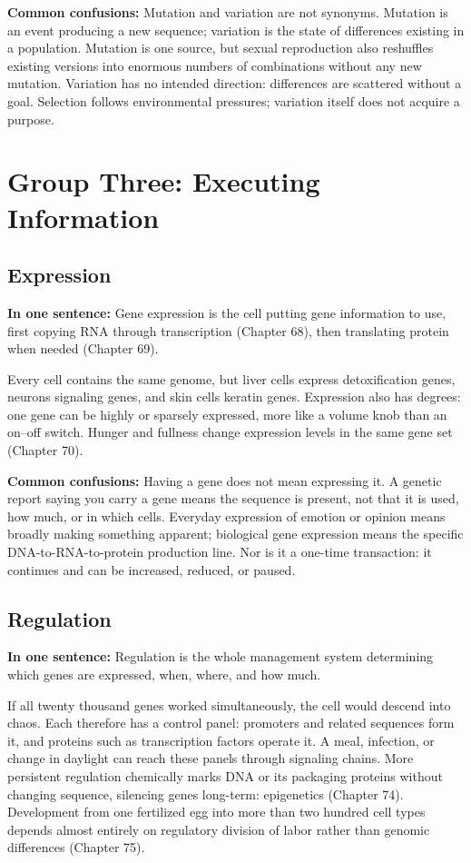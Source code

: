 \textbf{Common confusions:} Mutation and variation are not synonyms. Mutation is an event producing a new sequence; variation is the state of differences existing in a population. Mutation is one source, but sexual reproduction also reshuffles existing versions into enormous numbers of combinations without any new mutation. Variation has no intended direction: differences are scattered without a goal. Selection follows environmental pressures; variation itself does not acquire a purpose.

\section{Group Three: Executing Information}

\subsection{Expression}

\textbf{In one sentence:} Gene expression is the cell putting gene information to use, first copying RNA through transcription (Chapter 68), then translating protein when needed (Chapter 69).

Every cell contains the same genome, but liver cells express detoxification genes, neurons signaling genes, and skin cells keratin genes. Expression also has degrees: one gene can be highly or sparsely expressed, more like a volume knob than an on--off switch. Hunger and fullness change expression levels in the same gene set (Chapter 70).

\textbf{Common confusions:} Having a gene does not mean expressing it. A genetic report saying you carry a gene means the sequence is present, not that it is used, how much, or in which cells. Everyday expression of emotion or opinion means broadly making something apparent; biological gene expression means the specific DNA-to-RNA-to-protein production line. Nor is it a one-time transaction: it continues and can be increased, reduced, or paused.

\subsection{Regulation}

\textbf{In one sentence:} Regulation is the whole management system determining which genes are expressed, when, where, and how much.

If all twenty thousand genes worked simultaneously, the cell would descend into chaos. Each therefore has a control panel: promoters and related sequences form it, and proteins such as transcription factors operate it. A meal, infection, or change in daylight can reach these panels through signaling chains. More persistent regulation chemically marks DNA or its packaging proteins without changing sequence, silencing genes long-term: epigenetics (Chapter 74). Development from one fertilized egg into more than two hundred cell types depends almost entirely on regulatory division of labor rather than genomic differences (Chapter 75).

